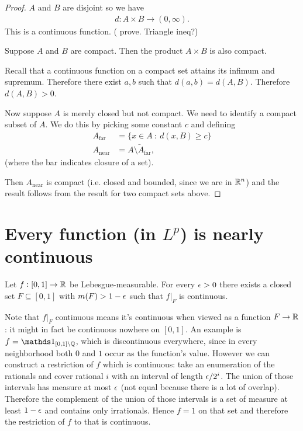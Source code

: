 \begin{proof}
  $A$ and $B$ are disjoint so we have
  \begin{align*}
    d: A \times B \to (0, \infty).
  \end{align*}
  This is a continuous function. ( prove. Triangle ineq?)

  Suppose $A$ and $B$ are compact. Then the product $A \times B$ is also compact.

  Recall that a continuous function on a compact set attains its infimum and supremum. Therefore there
  exist $a, b$ such that $d(a, b) = d(A, B)$. Therefore $d(A, B) > 0$.

  Now suppose $A$ is merely closed but not compact. We need to identify a compact subset of $A$. We do this by
  picking some constant $c$ and defining
  \begin{align*}
    A_{\text{far}} &= \{x \in A ~:~ d(x, B) \geq c\} \\
    A_{\text{near}} &= \bar{A \setminus A_{\text{far}}},
  \end{align*}
  (where the bar indicates closure of a set).

  Then $A_{\text{near}}$ is compact (i.e. closed and bounded, since we are in $\mathbb{R}^n$) and the result follows from the
  result for two compact sets above.
\end{proof}


\section{Every function (in $L^p$) is nearly continuous}

\begin{theorem}
  Let $f:[0, 1] \to \mathbb{R}$ be Lebesgue-measurable. For every $\epsilon > 0$ there exists a closed
  set $F \subseteq [0, 1]$ with $m(F) > 1 - \epsilon$ such that $f|_F$ is continuous.
\end{theorem}

\begin{remark*}
  Note that $f|_F$ continuous means it's continuous when viewed as a function $F \to \mathbb{R}$: it might in fact be
  continuous nowhere on $[0, 1]$. An example is $f = \ind_{[0,1] \setminus \Q}$, which is discontinuous
  everywhere, since in every neighborhood both $0$ and $1$ occur as the function's value. However we can
  construct a restriction of $f$ which is continuous: take an enumeration of the rationals and cover rational $i$
  with an interval of length $\epsilon/2^i$. The union of those intervals has measure at most $\epsilon$ (not equal
  because there is a lot of overlap). Therefore the complement of the union of those intervals is a set of
  measure at least $1 - \epsilon$ and contains only irrationals. Hence $f = 1$ on that set and therefore the
  restriction of $f$ to that is continuous.
\end{remark*}

